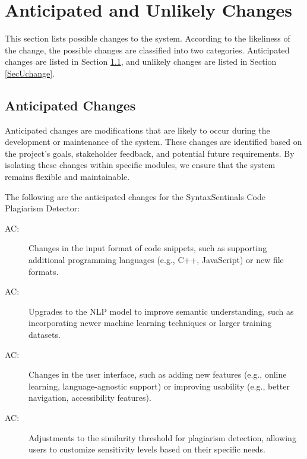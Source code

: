 \documentclass[12pt, titlepage]{article}
\newcounter{acnum}
\newcommand{\actheacnum}{AC\theacnum}
\begin{document}
\section{Anticipated and Unlikely Changes} \label{SecChange}

This section lists possible changes to the system. According to the likeliness
of the change, the possible changes are classified into two
categories. Anticipated changes are listed in Section \ref{SecAchange}, and
unlikely changes are listed in Section \ref{SecUchange}.

\subsection{Anticipated Changes} \label{SecAchange}


Anticipated changes are modifications that are likely to occur during the development or maintenance of the system. 
These changes are identified based on the project's goals, stakeholder feedback, and potential future requirements. 
By isolating these changes within specific modules, we ensure that the system remains flexible and maintainable.

The following are the anticipated changes for the SyntaxSentinals Code Plagiarism Detector:

\begin{description}
\item[ \actheacnum \label{acInput}:] Changes in the input format of code snippets, such as supporting additional programming languages (e.g., C++, JavaScript) or new file formats.
\item[ \actheacnum \label{acNLP}:] Upgrades to the NLP model to improve semantic understanding, such as incorporating newer machine learning techniques or larger training datasets.
\item[ \actheacnum \label{acUI}:] Changes in the user interface, such as adding new features (e.g., online learning, language-agnostic support) or improving usability (e.g., better navigation, accessibility features).
\item[ \actheacnum \label{acThreshold}:] Adjustments to the similarity threshold for plagiarism detection, allowing users to customize sensitivity levels based on their specific needs.
\end{description}
\end{document}

